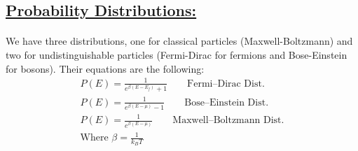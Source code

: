 \documentclass[a4paper,12pt]{article}
\begin{document}
\subsection*{\underline{Probability Distributions:}}
\paragraph{}We have three distributions, one for classical particles (Maxwell-Boltzmann) and two for undistinguishable particles (Fermi-Dirac for fermions and Bose-Einstein for bosons). Their equations are the following:
\begin{gather}
    P(E)=\frac{1}{e^{\beta(E -E_f)}+1} \qquad \text{Fermi--Dirac Dist.}\\
    P(E)=\frac{1}{e^{\beta(E -\mu)}-1} \qquad \text{Bose--Einstein Dist.}\\
    P(E)=\frac{1}{e^{\beta(E -\mu)}} \qquad \text{Maxwell--Boltzmann Dist.}\\
    \text{Where $\beta=\frac{1}{k_B T}$}
\end{gather}
\end{document}
